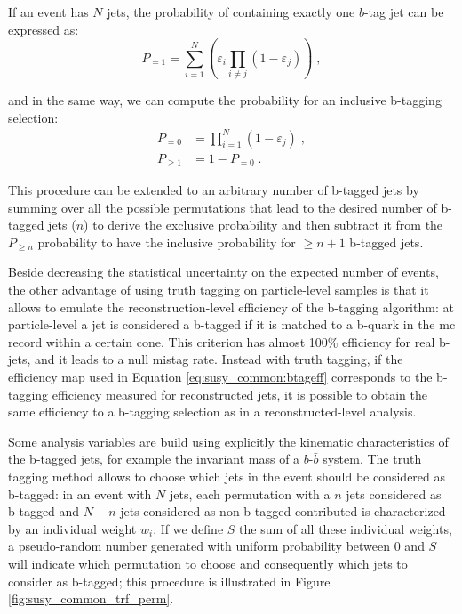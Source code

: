 \noindent If an event has $N$ jets, the probability of containing exactly one $b$-tag jet can be expressed as:
\begin{equation}
        P_{=1} = \sum\limits_{i=1}^N \left( \varepsilon_{i} \prod\limits_{i \neq j} \left( 1 - \varepsilon_{j} \right) \right) \; ,
\end{equation}

\noindent and in the same way, we can compute the probability for an inclusive b-tagging selection:
\begin{equation}
 \begin{split}
        P_{=0} &= \prod\limits_{i=1}^N \left( 1 - \varepsilon_{j} \right) \; ,\\
        P_{\geq 1} &= 1 - P_{=0} \; .
 \end{split}
\end{equation} 
 
\noindent This procedure can be extended to an arbitrary number of b-tagged jets by summing over all the possible permutations that lead to the desired number of b-tagged jets ($n$) to derive the exclusive probability and then subtract it from the $P_{\geq n}$ probability to have the inclusive probability for $\geq n+1$ b-tagged jets.
 
Beside decreasing the statistical uncertainty on the expected number of events, the other advantage of using truth tagging on particle-level samples is that it allows to emulate the reconstruction-level efficiency of the b-tagging algorithm: 
at particle-level a jet is considered a b-tagged if it is matched to a b-quark in the \gls{mc} record within a certain cone. This criterion has 
almost 100\% efficiency for real b-jets, and it leads to a null mistag rate. Instead with truth tagging, if the efficiency map used in Equation \ref{eq:susy_common:btageff} corresponds to the b-tagging efficiency measured for reconstructed jets, 
it is possible to obtain the same efficiency to a b-tagging selection as in a reconstructed-level analysis. 

Some analysis variables are build using explicitly the kinematic characteristics of the b-tagged jets, for example the invariant mass of a $b$-$\bar{b}$ system. The truth tagging method allows to choose which jets in the event should be considered as b-tagged: in an event with $N$ jets, each permutation with a $n$ jets considered as b-tagged and $N-n$ jets considered as non b-tagged contributed is characterized by an individual weight $w_i$. If we define $S$ the sum of all these individual weights, a pseudo-random number generated with uniform probability between 0 and $S$ will indicate which permutation to choose and consequently which jets to consider as b-tagged; this procedure is illustrated in Figure \ref{fig:susy_common_trf_perm}. 

